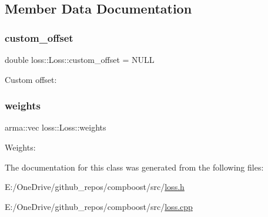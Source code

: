 \subsection{Member Data Documentation}
\mbox{\label{classloss_1_1_loss_ae5dc373f54ed65ee0ca54a921ef826f4}} 
\subsubsection{\texorpdfstring{custom\+\_\+offset}{custom\_offset}}
{\footnotesize\ttfamily double loss\+::\+Loss\+::custom\+\_\+offset = N\+U\+LL\hspace{0.3cm}{\ttfamily [protected]}}



Custom offset\+: 

\mbox{\label{classloss_1_1_loss_a4cfecaa4e3a6244ec82651607340e751}} 
\subsubsection{\texorpdfstring{weights}{weights}}
{\footnotesize\ttfamily arma\+::vec loss\+::\+Loss\+::weights\hspace{0.3cm}{\ttfamily [protected]}}



Weights\+: 



The documentation for this class was generated from the following files\+:\begin{DoxyCompactItemize}
\item 
E\+:/\+One\+Drive/github\+\_\+repos/compboost/src/\mbox{\hyperlink{loss_8h}{loss.\+h}}\item 
E\+:/\+One\+Drive/github\+\_\+repos/compboost/src/\mbox{\hyperlink{loss_8cpp}{loss.\+cpp}}\end{DoxyCompactItemize}
